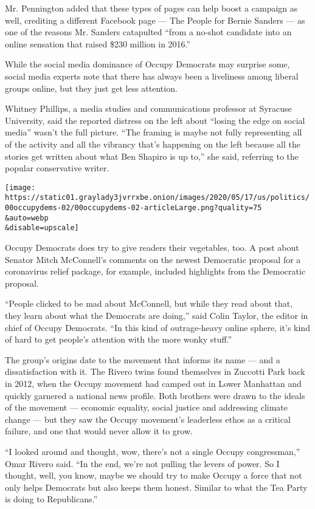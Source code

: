 Mr. Pennington added that these types of pages can help boost a campaign
as well, crediting a different Facebook page --- The People for Bernie
Sanders --- as one of the reasons Mr. Sanders catapulted ``from a
no-shot candidate into an online sensation that raised \$230 million in
2016.''

While the social media dominance of Occupy Democrats may surprise some,
social media experts note that there has always been a liveliness among
liberal groups online, but they just get less attention.

Whitney Phillips, a media studies and communications professor at
Syracuse University, said the reported distress on the left about
``losing the edge on social media'' wasn't the full picture. ``The
framing is maybe not fully representing all of the activity and all the
vibrancy that's happening on the left because all the stories get
written about what Ben Shapiro is up to,'' she said, referring to the
popular conservative writer.

\texttt{[image: https://static01.graylady3jvrrxbe.onion/images/2020/05/17/us/politics/00occupydems-02/00occupydems-02-articleLarge.png?quality=75\\\&auto=webp\\\&disable=upscale]}

Occupy Democrats does try to give readers their vegetables, too. A post
about Senator Mitch McConnell's comments on the newest Democratic
proposal for a coronavirus relief package, for example, included
highlights from the Democratic proposal.

``People clicked to be mad about McConnell, but while they read about
that, they learn about what the Democrats are doing,'' said Colin
Taylor, the editor in chief of Occupy Democrats. ``In this kind of
outrage-heavy online sphere, it's kind of hard to get people's attention
with the more wonky stuff.''

The group's origins date to the movement that informs its name --- and a
dissatisfaction with it. The Rivero twins found themselves in Zuccotti
Park back in 2012, when the Occupy movement had camped out in Lower
Manhattan and quickly garnered a national news profile. Both brothers
were drawn to the ideals of the movement --- economic equality, social
justice and addressing climate change --- but they saw the Occupy
movement's leaderless ethos as a critical failure, and one that would
never allow it to grow.

``I looked around and thought, wow, there's not a single Occupy
congressman,'' Omar Rivero said. ``In the end, we're not pulling the
levers of power. So I thought, well, you know, maybe we should try to
make Occupy a force that not only helps Democrats but also keeps them
honest. Similar to what the Tea Party is doing to Republicans.''

